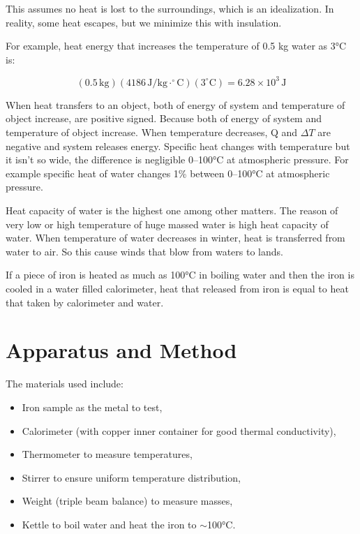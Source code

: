 \documentclass[12pt, a4paper]{article}
\begin{document}
This assumes no heat is lost to the surroundings, which is an idealization. In reality, some heat escapes, but we minimize this with insulation.

For example, heat energy that increases the temperature of 0.5 kg water as 3°C is:

\[ (0.5 \, \text{kg})(4186 \, \text{J/kg}\cdot^\circ\text{C})(3^\circ\text{C}) = 6.28 \times 10^3 \, \text{J} \]

When heat transfers to an object, both of energy of system and temperature of object increase, are positive signed. Because both of energy of system and temperature of object increase. When temperature decreases, Q and $\Delta T$ are negative and system releases energy. Specific heat changes with temperature but it isn't so wide, the difference is negligible 0--100°C at atmospheric pressure. For example specific heat of water changes 1\% between 0--100°C at atmospheric pressure.

Heat capacity of water is the highest one among other matters. The reason of very low or high temperature of huge massed water is high heat capacity of water. When temperature of water decreases in winter, heat is transferred from water to air. So this cause winds that blow from waters to lands.

If a piece of iron is heated as much as 100°C in boiling water and then the iron is cooled in a water filled calorimeter, heat that released from iron is equal to heat that taken by calorimeter and water.

\section{Apparatus and Method}
The materials used include:
\begin{itemize}
\item Iron sample as the metal to test,
\item Calorimeter (with copper inner container for good thermal conductivity),
\item Thermometer to measure temperatures,
\item Stirrer to ensure uniform temperature distribution,
\item Weight (triple beam balance) to measure masses,
\item Kettle to boil water and heat the iron to $\sim$100°C.
\end{itemize}
\end{document}
